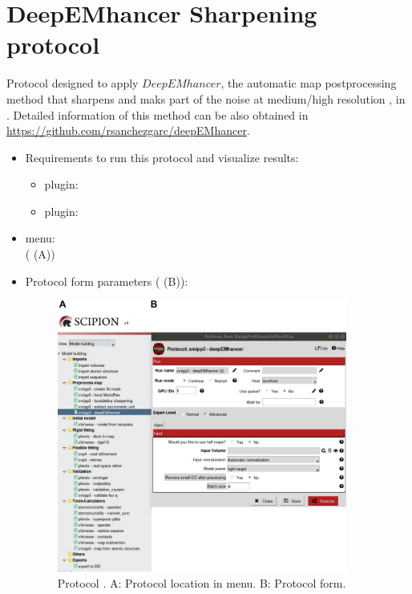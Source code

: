 \section{DeepEMhancer Sharpening protocol}
\label{app:deepEMhancerSharpening}%

Protocol designed to apply $DeepEMhancer$, the automatic map postprocessing method that sharpens and maks part of the noise at medium/high resolution \citep{Sanchez-Garcia2020.06.12.148296}, in \scipion. Detailed information of this method can be also obtained in \url{https://github.com/rsanchezgarc/deepEMhancer}.

\begin{itemize}
 \item Requirements to run this protocol and visualize results:
    \begin{itemize}
        \item \scipion plugin: 
        \item \scipion plugin: 
    \end{itemize}
 \item \scipion menu:\\
   ( (A))
  
 \item Protocol form parameters ( (B)):
  
    \begin{figure}[H]
     \centering 
     \captionsetup{width=.7\linewidth} 
     \includegraphics[width=0.90\textwidth]{Images_appendix/Fig303}
     \caption{Protocol . A: Protocol location in \scipion menu. B: Protocol form.}
     \label{fig:app_deepEMhancer_1}
    \end{figure}
    

\end{itemize}
